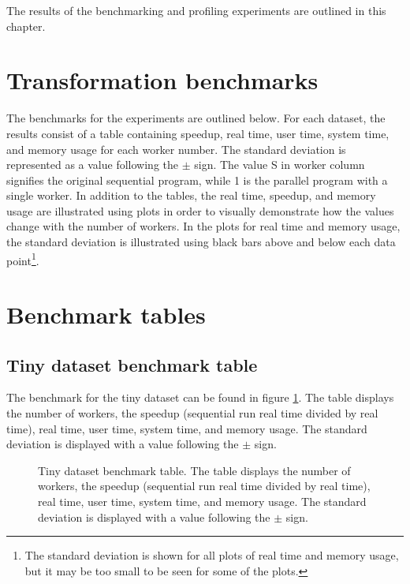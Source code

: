 

The results of the benchmarking and profiling experiments are outlined in this chapter.
\section{Transformation benchmarks}
The benchmarks for the experiments are outlined below. For each dataset, the results consist of a table containing
speedup, real time, user time, system time, and memory usage for each worker number. The standard deviation is represented
as a value following the $\pm$ sign. The value S in worker column signifies the original sequential program, while 1 is the
parallel program with a single worker. In addition to the tables, the real time, speedup, and memory usage are illustrated
using plots in order to visually demonstrate how the values change with the number of workers. In the plots for real time
and memory usage, the standard deviation is illustrated using black bars above and below each data point\footnote{
The standard deviation is shown for all plots of real time and memory usage, but it may be too small to be seen for some of the plots.}.

\section{Benchmark tables}
\subsection{Tiny dataset benchmark table}
The benchmark for the tiny dataset can be found in figure \ref{fig:dataset_1_table}.
The table displays the number of workers, the speedup (sequential run real time divided by real time), real time,
user time, system time, and memory usage. The standard deviation is displayed with a value following the $\pm$ sign.

\begin{figure}[ht]
\centering
{}
\caption[Tiny dataset benchmark table.]{Tiny dataset benchmark table. The table displays the number of workers, the speedup (sequential run real time divided by real time), real time,
user time, system time, and memory usage. The standard deviation is displayed with a value following the $\pm$ sign.}
\label{fig:dataset_1_table}
\end{figure}

